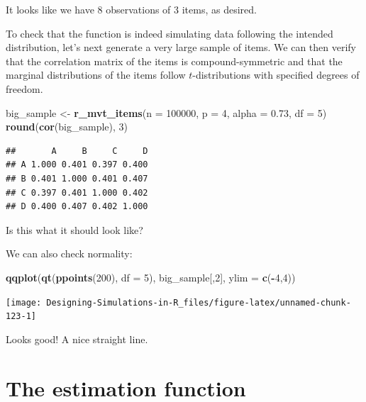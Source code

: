 \documentclass[
]{book}
\newenvironment{Shaded}{\begin{snugshade}}{\end{snugshade}}
\newcommand{\AttributeTok}[1]{\textcolor[rgb]{0.13,0.29,0.53}{#1}}
\newcommand{\DecValTok}[1]{\textcolor[rgb]{0.00,0.00,0.81}{#1}}
\newcommand{\FloatTok}[1]{\textcolor[rgb]{0.00,0.00,0.81}{#1}}
\newcommand{\FunctionTok}[1]{\textcolor[rgb]{0.13,0.29,0.53}{\textbf{#1}}}
\newcommand{\NormalTok}[1]{#1}
\newcommand{\OtherTok}[1]{\textcolor[rgb]{0.56,0.35,0.01}{#1}}
\newcommand{\SpecialCharTok}[1]{\textcolor[rgb]{0.81,0.36,0.00}{\textbf{#1}}}
\begin{document}
It looks like we have 8 observations of 3 items, as desired.

To check that the function is indeed simulating data following the intended distribution, let's next generate a very large sample of items. We can then verify that the correlation matrix of the items is compound-symmetric and that the marginal distributions of the items follow \(t\)-distributions with specified degrees of freedom.

\begin{Shaded}
\begin{Highlighting}[]
\NormalTok{big\_sample }\OtherTok{\textless{}{-}} \FunctionTok{r\_mvt\_items}\NormalTok{(}\AttributeTok{n =} \DecValTok{100000}\NormalTok{, }\AttributeTok{p =} \DecValTok{4}\NormalTok{, }\AttributeTok{alpha =} \FloatTok{0.73}\NormalTok{, }\AttributeTok{df =} \DecValTok{5}\NormalTok{)}
\FunctionTok{round}\NormalTok{(}\FunctionTok{cor}\NormalTok{(big\_sample), }\DecValTok{3}\NormalTok{)}
\end{Highlighting}
\end{Shaded}

\begin{verbatim}
##       A     B     C     D
## A 1.000 0.401 0.397 0.400
## B 0.401 1.000 0.401 0.407
## C 0.397 0.401 1.000 0.402
## D 0.400 0.407 0.402 1.000
\end{verbatim}

Is this what it should look like?

We can also check normality:

\begin{Shaded}
\begin{Highlighting}[]
\FunctionTok{qqplot}\NormalTok{(}\FunctionTok{qt}\NormalTok{(}\FunctionTok{ppoints}\NormalTok{(}\DecValTok{200}\NormalTok{), }\AttributeTok{df =} \DecValTok{5}\NormalTok{), big\_sample[,}\DecValTok{2}\NormalTok{], }\AttributeTok{ylim =} \FunctionTok{c}\NormalTok{(}\SpecialCharTok{{-}}\DecValTok{4}\NormalTok{,}\DecValTok{4}\NormalTok{))}
\end{Highlighting}
\end{Shaded}

\begin{center}\texttt{[image: Designing-Simulations-in-R\_files/figure-latex/unnamed-chunk-123-1]} \end{center}

Looks good! A nice straight line.

\section{The estimation function}\label{the-estimation-function}
\end{document}
